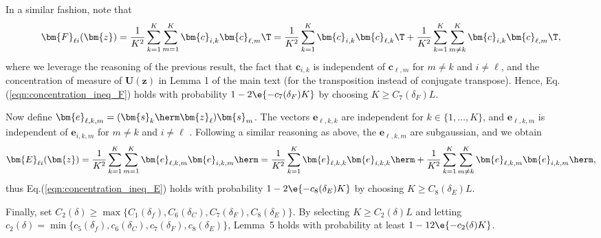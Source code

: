 In a similar fashion, note that
\begin{align}
\bm{F}_{{\ell}i}(\bm{z})=\frac{1}{K^2}\sum_{k=1}^K\sum_{m=1}^K\bm{c}_{i,k}\bm{c}_{{\ell},m}\T=\frac{1}{K^2}\sum_{k=1}^K\bm{c}_{i,k}\bm{c}_{{\ell},k}\T+\frac{ 1}{K^2}\sum_{k=1}^K\sum_{m\neq k}^K\bm{c}_{i,k}\bm{c}_{{\ell},m}\T,
\end{align}
where we leverage the reasoning of the previous result, the fact that $\bm{c}_{i,k}$ is independent of $\bm{c}_{{\ell},m}$ for $m\neq k$ and $i\neq {\ell}$, and the concentration of measure of $\bm{U}(\bm{z})$ in Lemma 1 of the main text (for the transposition instead of conjugate transpose). Hence, Eq.(\ref{eqn:concentration_ineq_F}) holds with probability $1-2\e{-c_7(\delta_F)K}$ by choosing $K\geq C_7(\delta_F)L$. 

Now define $\bm{e}_{{\ell},k,m}=(\bm{s}_k\herm\bm{z}_{\ell})\bm{s}_m$. The vectors $\bm{e}_{{\ell},k,k}$ are independent for $k\in\{1,\ldots,K\}$, and $\bm{e}_{{\ell},k,m}$ is independent of $\bm{e}_{i,k,m}$ for $m\neq k$ and $i\neq {\ell}$
. Following a similar reasoning as above, the $\bm{e}_{{\ell},k,m}$ are subgaussian, and we obtain
\begin{align}
\bm{E}_{{\ell}i}(\bm{z})=\frac{1}{K^2}\sum_{k=1}^K\sum_{m=1}^K\bm{e}_{{\ell},k,m}\bm{e}_{i,k,m}\herm=\frac{1}{K^2}\sum_{k=1}^K\bm{e}_{{\ell},k,k}\bm{e}_{i,k,k}\herm+\frac{1}{K^2}\sum_{k=1}^K\sum_{m\neq k}^K\bm{e}_{{\ell},k,m}\bm{e}_{i,k,m}\herm,
\end{align}
thus Eq.(\ref{eqn:concentration_ineq_E}) holds with probability $1-2\e{-c_8(\delta_E)K}$ by choosing $K\geq C_8(\delta_E)L$. 

Finally, set $C_2(\delta)\geq\max\{C_1(\delta_f),C_6(\delta_C),C_7(\delta_F),C_8(\delta_E)\}$. By selecting $K\geq C_2(\delta)L$ and letting $c_2(\delta)=\min\{c_5(\delta_f),c_6(\delta_C),c_7(\delta_F),c_8(\delta_E)\}$, Lemma~5 holds with probability at least $1-12\e{-c_2(\delta)K}$.







